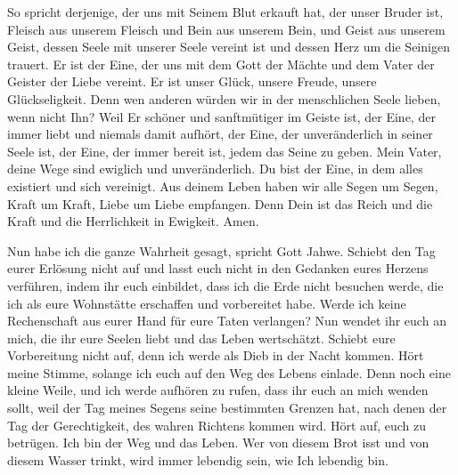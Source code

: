         So spricht derjenige, der uns mit Seinem Blut erkauft hat, der unser Bruder ist, Fleisch aus unserem Fleisch und Bein aus unserem Bein, und Geist aus unserem Geist, dessen Seele mit unserer Seele vereint ist und dessen Herz um die Seinigen trauert. Er ist der Eine, der uns mit dem Gott der Mächte und dem Vater der Geister der Liebe vereint. Er ist unser Glück, unsere Freude, unsere Glückseligkeit. Denn wen anderen würden wir in der menschlichen Seele lieben, wenn nicht Ihn? Weil Er schöner und sanftmütiger im Geiste ist, der Eine, der immer liebt und niemals damit aufhört, der Eine, der unveränderlich in seiner Seele ist, der Eine, der immer bereit ist, jedem das Seine zu geben. Mein Vater, deine Wege sind ewiglich und unveränderlich. Du bist der Eine, in dem alles existiert und sich vereinigt. Aus deinem Leben haben wir alle Segen um Segen, Kraft um Kraft, Liebe um Liebe empfangen. Denn Dein ist das Reich und die Kraft und die Herrlichkeit in Ewigkeit. Amen. 
        
        Nun habe ich die ganze Wahrheit gesagt, spricht Gott Jahwe. Schiebt den Tag eurer Erlösung nicht auf und lasst euch nicht in den Gedanken eures Herzens verführen, indem ihr euch einbildet, dass ich die Erde nicht besuchen werde, die ich als eure Wohnstätte erschaffen und vorbereitet habe. Werde ich keine Rechenschaft aus eurer Hand für eure Taten verlangen? Nun wendet ihr euch an mich, die ihr eure Seelen liebt und das Leben wertschätzt. Schiebt eure Vorbereitung nicht auf, denn ich werde als Dieb in der Nacht kommen. Hört meine Stimme, solange ich euch auf den Weg des Lebens einlade. Denn noch eine kleine Weile, und ich werde aufhören zu rufen, dass ihr euch an mich wenden sollt, weil der Tag meines Segens seine bestimmten Grenzen hat, nach denen der Tag der Gerechtigkeit, des wahren Richtens kommen wird. Hört auf, euch zu betrügen. Ich bin der Weg und das Leben. Wer von diesem Brot isst und von diesem Wasser trinkt, wird immer lebendig sein, wie Ich lebendig bin. 
        
